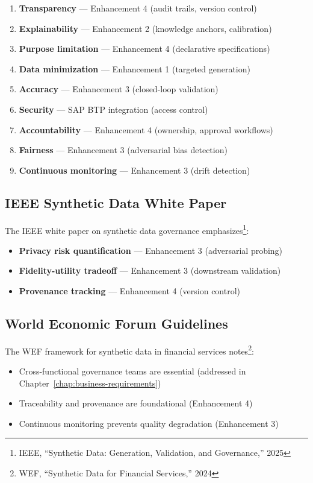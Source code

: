 \begin{enumerate}
  \item \textbf{Transparency} --- Enhancement 4 (audit trails, version control)
  \item \textbf{Explainability} --- Enhancement 2 (knowledge anchors, calibration)
  \item \textbf{Purpose limitation} --- Enhancement 4 (declarative specifications)
  \item \textbf{Data minimization} --- Enhancement 1 (targeted generation)
  \item \textbf{Accuracy} --- Enhancement 3 (closed-loop validation)
  \item \textbf{Security} --- SAP BTP integration (access control)
  \item \textbf{Accountability} --- Enhancement 4 (ownership, approval workflows)
  \item \textbf{Fairness} --- Enhancement 3 (adversarial bias detection)
  \item \textbf{Continuous monitoring} --- Enhancement 3 (drift detection)
\end{enumerate}

\subsection{IEEE Synthetic Data White Paper}

The IEEE white paper on synthetic data governance emphasizes\footnote{IEEE, 
``Synthetic Data: Generation, Validation, and Governance,'' 2025}:

\begin{itemize}
  \item \textbf{Privacy risk quantification} --- Enhancement 3 (adversarial probing)
  \item \textbf{Fidelity-utility tradeoff} --- Enhancement 3 (downstream validation)
  \item \textbf{Provenance tracking} --- Enhancement 4 (version control)
\end{itemize}

\subsection{World Economic Forum Guidelines}

The WEF framework for synthetic data in financial services notes\footnote{WEF, 
``Synthetic Data for Financial Services,'' 2024}:

\begin{itemize}
  \item Cross-functional governance teams are essential (addressed in Chapter~\ref{chap:business-requirements})
  \item Traceability and provenance are foundational (Enhancement 4)
  \item Continuous monitoring prevents quality degradation (Enhancement 3)
\end{itemize}


